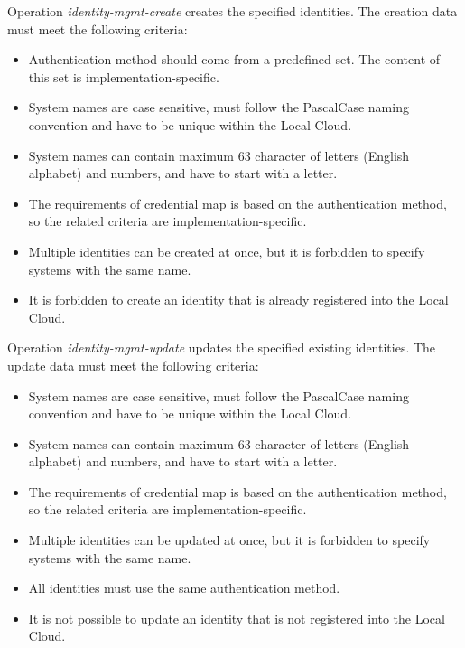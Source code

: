 \documentclass[a4paper]{arrowhead}
\begin{document}

Operation \textit{identity-mgmt-create} creates the specified identities. The creation data must meet the following criteria:

\begin{itemize}
    \item Authentication method should come from a predefined set. The content of this set is implementation-specific.
    \item System names are case sensitive, must follow the PascalCase naming convention and have to be unique within the Local Cloud.
    \item System names can contain maximum 63 character of letters (English alphabet) and numbers, and have to start with a letter.
    \item The requirements of credential map is based on the authentication method, so the related criteria are implementation-specific.
    \item Multiple identities can be created at once, but it is forbidden to specify systems with the same name.
    \item It is forbidden to create an identity that is already registered into the Local Cloud.
\end{itemize}


Operation \textit{identity-mgmt-update} updates the specified existing identities. The update data must meet the following criteria:

\begin{itemize}
    \item System names are case sensitive, must follow the PascalCase naming convention and have to be unique within the Local Cloud.
    \item System names can contain maximum 63 character of letters (English alphabet) and numbers, and have to start with a letter.
    \item The requirements of credential map is based on the authentication method, so the related criteria are implementation-specific.
    \item Multiple identities can be updated at once, but it is forbidden to specify systems with the same name.
    \item All identities must use the same authentication method.
    \item It is not possible to update an identity that is not registered into the Local Cloud.
\end{itemize}
\end{document}
